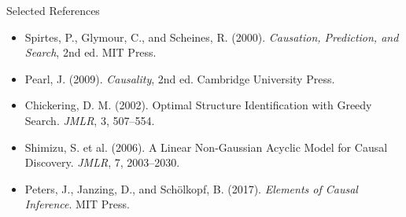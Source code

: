 \documentclass[aspectratio=169,11pt]{beamer}
\begin{document}
\begin{frame}{Selected References}
\small
\begin{itemize}
\item Spirtes, P., Glymour, C., and Scheines, R. (2000). \textit{Causation, Prediction, and Search}, 2nd ed. MIT Press.
\item Pearl, J. (2009). \textit{Causality}, 2nd ed. Cambridge University Press.
\item Chickering, D. M. (2002). Optimal Structure Identification with Greedy Search. \textit{JMLR}, 3, 507--554.
\item Shimizu, S. et al. (2006). A Linear Non-Gaussian Acyclic Model for Causal Discovery. \textit{JMLR}, 7, 2003--2030.
\item Peters, J., Janzing, D., and Schölkopf, B. (2017). \textit{Elements of Causal Inference}. MIT Press.
\end{itemize}
\end{frame}

\contactslide
\end{document}

